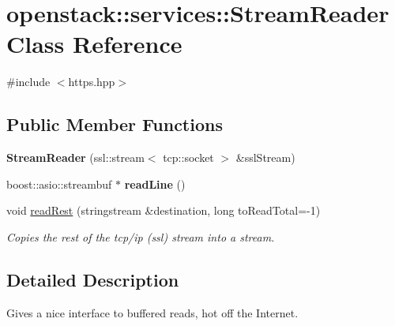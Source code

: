 \hypertarget{classopenstack_1_1services_1_1StreamReader}{
\section{openstack::services::StreamReader Class Reference}
\label{classopenstack_1_1services_1_1StreamReader}
}


{\ttfamily \#include $<$https.hpp$>$}

\subsection*{Public Member Functions}
\begin{DoxyCompactItemize}
\item 
\hypertarget{classopenstack_1_1services_1_1StreamReader_a7f0c5ac6284458187437864b542e91cb}{
{\bfseries StreamReader} (ssl::stream$<$ tcp::socket $>$ \&sslStream)}
\label{classopenstack_1_1services_1_1StreamReader_a7f0c5ac6284458187437864b542e91cb}

\item 
\hypertarget{classopenstack_1_1services_1_1StreamReader_a8b68ca0f0c9e14d24ac1fdbbe9714f36}{
boost::asio::streambuf $\ast$ {\bfseries readLine} ()}
\label{classopenstack_1_1services_1_1StreamReader_a8b68ca0f0c9e14d24ac1fdbbe9714f36}

\item 
void \hyperlink{classopenstack_1_1services_1_1StreamReader_a6ff0cc95f230e2ae9bc6bcd7dcffdd62}{readRest} (stringstream \&destination, long toReadTotal=-\/1)
\begin{DoxyCompactList}\small\item\em Copies the rest of the tcp/ip (ssl) stream into a stream. \item\end{DoxyCompactList}\end{DoxyCompactItemize}


\subsection{Detailed Description}
Gives a nice interface to buffered reads, hot off the Internet. 

